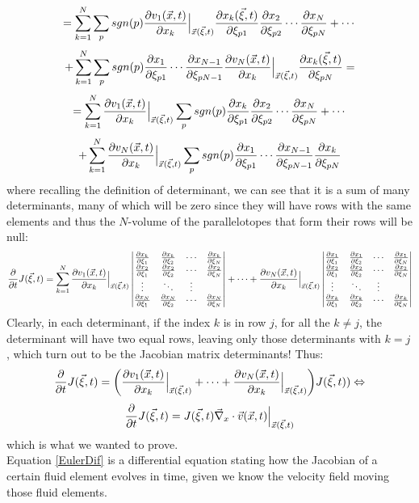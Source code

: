 \documentclass[11pt, a4paper]{article} %
\DeclareRobustCommand{\mybox}[2][gray!20]{%
\begin{tcolorbox}[   %
        left=1cm,
        right=1cm,
        top=0.5cm,
        bottom=0.5cm,
        colback=#1,
        colframe=#1,
        width=\dimexpr\textwidth\relax, 
        enlarge left by=0mm,
        boxsep=5pt,
        arc=0pt,outer arc=0pt,
        ]
        #2
\end{tcolorbox}
}
\begin{document}
\mybox{
$$
=\sum_{k=1}^N\sum_p sgn(p) \pdv{v_1(\vec{x},t)}{x_k}\Big\rvert_{\vec{x}(\vec{\xi},t)}\pdv{x_k(\vec{\xi},t)}{\xi_{p1}}\pdv{x_2}{\xi_{p2}} \cdots \pdv{x_N}{\xi_{pN}}+\cdots 
$$
$$
+ \sum_{k=1}^N\sum_p sgn(p)\pdv{x_1}{\xi_{p1}} \cdots \pdv{x_{N-1}}{\xi_{pN-1}}\pdv{v_N(\vec{x},t)}{x_k}\Big\rvert_{\vec{x}(\vec{\xi},t)}\pdv{x_k(\vec{\xi},t)}{\xi_{pN}}=
$$
$$
=\sum_{k=1}^N \pdv{v_1(\vec{x},t)}{x_k}\Big\rvert_{\vec{x}(\vec{\xi},t)}\sum_p sgn(p)\pdv{x_k}{\xi_{p1}}\pdv{x_2}{\xi_{p2}} \cdots \pdv{x_N}{\xi_{pN}}+\cdots 
$$
$$
+ \sum_{k=1}^N\pdv{v_N(\vec{x},t)}{x_k}\Big\rvert_{\vec{x}(\vec{\xi},t)}\sum_p sgn(p)\pdv{x_1}{\xi_{p1}} \cdots \pdv{x_{N-1}}{\xi_{pN-1}}\pdv{x_k}{\xi_{pN}}
$$
where recalling the definition of determinant, we can see that it is a sum of many determinants, many of which will be zero since they will have rows with the same elements and thus the $N$-volume of the parallelotopes that form their rows will be null:
\begin{equation}
\pdv{}{t}J(\vec{\xi},t)=\sum_{k=1}^N \pdv{v_1(\vec{x},t)}{x_k}\Big\rvert_{\vec{x}(\vec{\xi},t)} \begin{vmatrix}
\pdv{x_k}{\xi_{1}}&\pdv{x_k}{\xi_{2}} &\cdots &\pdv{x_k}{\xi_{N}}\\
\pdv{x_2}{\xi_{1}}&\pdv{x_2}{\xi_{2}} &\cdots &\pdv{x_2}{\xi_{N}}\\
\vdots & \ddots & \vdots\\
\pdv{x_N}{\xi_{1}}&\pdv{x_N}{\xi_{2}} &\cdots &\pdv{x_N}{\xi_{N}}
\end{vmatrix}+\cdots+
\pdv{v_N(\vec{x},t)}{x_k}\Big\rvert_{\vec{x}(\vec{\xi},t)} \begin{vmatrix}
\pdv{x_1}{\xi_{1}}&\pdv{x_1}{\xi_{2}} &\cdots &\pdv{x_1}{\xi_{N}}\\
\pdv{x_2}{\xi_{1}}&\pdv{x_2}{\xi_{2}} &\cdots &\pdv{x_2}{\xi_{N}}\\
\vdots & \ddots & \vdots\\
\pdv{x_k}{\xi_{1}}&\pdv{x_k}{\xi_{2}} &\cdots &\pdv{x_k}{\xi_{N}}
\end{vmatrix}
\end{equation}
Clearly, in each determinant, if the index $k$ is in row $j$, for all the $k\neq j$, the determinant will have two equal rows, leaving only those determinants with $k=j$, which turn out to be the Jacobian matrix determinants! Thus:
\begin{equation}
\pdv{}{t}J(\vec{\xi},t)=\qty(\pdv{v_1(\vec{x},t)}{x_k}\Big\rvert_{\vec{x}(\vec{\xi},t)}+\cdots+\pdv{v_N(\vec{x},t)}{x_k}\Big\rvert_{\vec{x}(\vec{\xi},t)}) J(\vec{\xi},t))\Leftrightarrow
\end{equation}
\begin{equation}\label{EulerDif}
\pdv{}{t}J(\vec{\xi},t)=J(\vec{\xi},t)\vec{\nabla}_x\cdot\vec{v}(\vec{x},t)\Big\rvert_{\vec{x}(\vec{\xi},t)}
\end{equation}
which is what we wanted to prove.\\
Equation \eqref{EulerDif} is a differential equation stating how the Jacobian of a certain fluid element evolves in time, given we know the velocity field moving those fluid elements.\\

}
\end{document}
